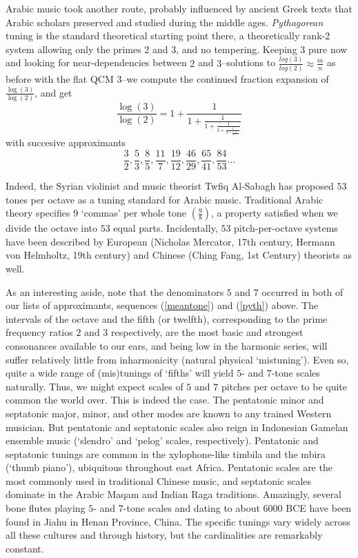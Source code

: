 \documentclass[12pt]{article}
\begin{document}
Arabic music took another route, probably influenced by ancient Greek texts that Arabic scholars preserved and studied during the middle ages.  \emph{Pythagorean} tuning is the standard theoretical starting point there, a theoretically rank-2 system allowing only the primes 2 and 3, and no tempering.  Keeping 3 pure now and looking for near-dependencies between $2$ and $3$--solutions to $\frac{log(3)}{log(2)}\approx \frac{m}{n}$ as before with the flat QCM $3$--we compute the continued fraction expansion of $\frac{\log(3)}{\log(2)}$, and get
\[\frac{\log(3)}{\log(2)}=1+\frac{1}{1+\frac{1}{1+\frac{1}{2+\frac{1}{2+\frac{1}{3+\ldots}}}}}\]
with succesive approximants
\begin{equation}
\frac{3}{2},\frac{5}{3},\frac{8}{5},\frac{11}{7},\frac{19}{12},\frac{46}{29},\frac{65}{41},\frac{84}{53}\ldots\label{pyth}
\end{equation}\vspace{.5pt}
\par
Indeed, the Syrian violinist and music theorist Twfiq Al-Sabagh has proposed $53$ tones per octave as a tuning standard for Arabic music.  Traditional Arabic theory specifies $9$ `commas' per whole tone $(\tfrac{9}{8})$, a property satisfied when we divide the octave into $53$ equal parts.  Incidentally, $53$ pitch-per-octave systems have been described by European (Nicholas Mercator, 17th century, Hermann von Helmholtz, 19th century) and Chinese (Ching Fang, 1st Century) theorists as well.\\
\par
As an interesting aside, note that the denominators $5$ and $7$ occurred in both of our lists of approximants, sequences (\ref{meantone}) and (\ref{pyth}) above.  The intervals of the octave and the fifth (or twelfth), corresponding to the prime frequency ratios $2$ and $3$ respectively, are the most basic and strongest consonances available to our ears, and being low in the harmonic series, will suffer relatively little from inharmonicity (natural physical `mistuning').  Even so, quite a wide range of (mis)tunings of `fifths' will yield $5$- and $7$-tone scales naturally.  Thus, we might expect scales of $5$ and $7$ pitches per octave to be quite common the world over.  This is indeed the case.  The pentatonic minor and septatonic major, minor, and other modes are known to any trained Western musician.  But pentatonic and septatonic scales also reign in Indonesian Gamelan ensemble music (`slendro' and `pelog' scales, respectively).  Pentatonic and septatonic tunings are common in the xylophone-like timbila and the mbira (`thumb piano'), ubiquitous throughout east Africa.  Pentatonic scales are the most commonly used in traditional Chinese music, and septatonic scales dominate in the Arabic Maqam and Indian Raga traditions.  Amazingly, several bone flutes playing $5$- and $7$-tone scales and dating to about 6000 BCE have been found in Jiahu in Henan Province, China.  The specific tunings vary widely across all these cultures and through history, but the cardinalities are remarkably constant.\\
\end{document}
